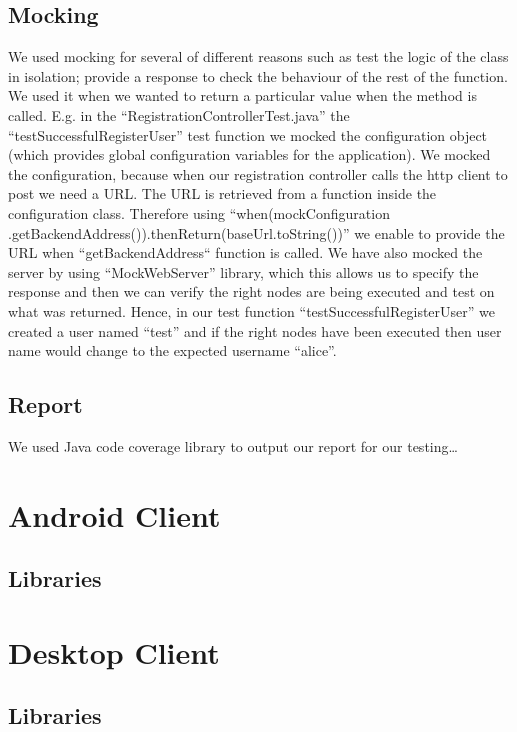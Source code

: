 \documentclass[11pt,a4paper]{report}
\begin{document}
\subsection{Mocking}
We used mocking for several of different reasons such as test the logic of the class in isolation; provide a response to check the behaviour of the rest of the function. We used it when we wanted to return a particular value when the method is called. E.g. in the “RegistrationControllerTest.java” the “testSuccessfulRegisterUser” test function we mocked the configuration object (which provides global configuration variables for the application). We mocked the configuration, because when our registration controller calls the http client to post we need a URL. The URL is retrieved from a function inside the configuration class. Therefore using “when(mockConfiguration
.getBackendAddress()).thenReturn(baseUrl.toString())” we enable to provide the URL when “getBackendAddress“ function is called. We have also mocked the server by using “MockWebServer” library, which this allows us to specify the response and then we can verify the right nodes are being executed and test on what was returned. Hence, in our test function “testSuccessfulRegisterUser” we created a user named “test” and if the right nodes have been executed then user name would change to the expected username “alice”. 

\subsection{Report}
We used Java code coverage library to output our report for our testing… 

\section{Android Client}

\subsection{Libraries}

\section{Desktop Client}

\subsection{Libraries}
\end{document}
